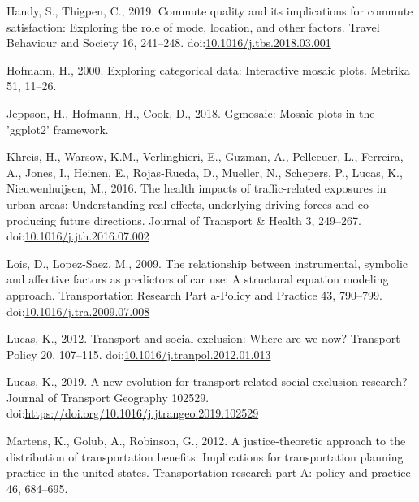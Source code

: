 \documentclass[]{elsarticle} %
\begin{document}
\leavevmode\hypertarget{ref-Handy2019commute}{}%
Handy, S., Thigpen, C., 2019. Commute quality and its implications for
commute satisfaction: Exploring the role of mode, location, and other
factors. Travel Behaviour and Society 16, 241--248.
doi:\href{https://doi.org/10.1016/j.tbs.2018.03.001}{10.1016/j.tbs.2018.03.001}

\leavevmode\hypertarget{ref-Hofmann2000exploring}{}%
Hofmann, H., 2000. Exploring categorical data: Interactive mosaic plots.
Metrika 51, 11--26.

\leavevmode\hypertarget{ref-Jeppson2019ggmosaic}{}%
Jeppson, H., Hofmann, H., Cook, D., 2018. Ggmosaic: Mosaic plots in the
'ggplot2' framework.

\leavevmode\hypertarget{ref-Khreis2016health}{}%
Khreis, H., Warsow, K.M., Verlinghieri, E., Guzman, A., Pellecuer, L.,
Ferreira, A., Jones, I., Heinen, E., Rojas-Rueda, D., Mueller, N.,
Schepers, P., Lucas, K., Nieuwenhuijsen, M., 2016. The health impacts of
traffic-related exposures in urban areas: Understanding real effects,
underlying driving forces and co-producing future directions. Journal of
Transport \& Health 3, 249--267.
doi:\href{https://doi.org/10.1016/j.jth.2016.07.002}{10.1016/j.jth.2016.07.002}

\leavevmode\hypertarget{ref-Lois2009relationship}{}%
Lois, D., Lopez-Saez, M., 2009. The relationship between instrumental,
symbolic and affective factors as predictors of car use: A structural
equation modeling approach. Transportation Research Part a-Policy and
Practice 43, 790--799.
doi:\href{https://doi.org/10.1016/j.tra.2009.07.008}{10.1016/j.tra.2009.07.008}

\leavevmode\hypertarget{ref-Lucas2012transport}{}%
Lucas, K., 2012. Transport and social exclusion: Where are we now?
Transport Policy 20, 107--115.
doi:\href{https://doi.org/10.1016/j.tranpol.2012.01.013}{10.1016/j.tranpol.2012.01.013}

\leavevmode\hypertarget{ref-Lucas2019evolution}{}%
Lucas, K., 2019. A new evolution for transport-related social exclusion
research? Journal of Transport Geography 102529.
doi:\href{https://doi.org/https://doi.org/10.1016/j.jtrangeo.2019.102529}{https://doi.org/10.1016/j.jtrangeo.2019.102529}

\leavevmode\hypertarget{ref-Martens2012justice}{}%
Martens, K., Golub, A., Robinson, G., 2012. A justice-theoretic approach
to the distribution of transportation benefits: Implications for
transportation planning practice in the united states. Transportation
research part A: policy and practice 46, 684--695.
\end{document}

